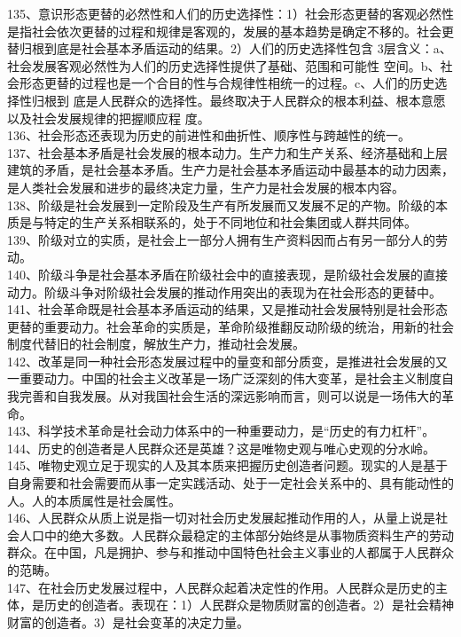 \documentclass[a4paper,fleqn]{article}
\begin{document}
135、意识形态更替的必然性和人们的历史选择性：1）社会形态更替的客观必然性是指社会依次更替的过程和规律是客观的，发展的基本趋势是确定不移的。社会更替归根到底是社会基本矛盾运动的结果。2）人们的历史选择性包含 3层含义：a、社会发展客观必然性为人们的历史选择性提供了基础、范围和可能性 空间。b、社会形态更替的过程也是一个合目的性与合规律性相统一的过程。c、人们的历史选择性归根到 底是人民群众的选择性。最终取决于人民群众的根本利益、根本意愿以及社会发展规律的把握顺应程 度。 \\
136、社会形态还表现为历史的前进性和曲折性、顺序性与跨越性的统一。 \\
137、社会基本矛盾是社会发展的根本动力。生产力和生产关系、经济基础和上层建筑的矛盾，是社会基本矛盾。生产力是社会基本矛盾运动中最基本的动力因素，是人类社会发展和进步的最终决定力量，生产力是社会发展的根本内容。 \\
138、阶级是社会发展到一定阶段及生产有所发展而又发展不足的产物。阶级的本质是与特定的生产关系相联系的，处于不同地位和社会集团或人群共同体。 \\
139、阶级对立的实质，是社会上一部分人拥有生产资料因而占有另一部分人的劳动。 \\
140、阶级斗争是社会基本矛盾在阶级社会中的直接表现，是阶级社会发展的直接动力。阶级斗争对阶级社会发展的推动作用突出的表现为在社会形态的更替中。 \\
141、社会革命既是社会基本矛盾运动的结果，又是推动社会发展特别是社会形态更替的重要动力。社会革命的实质是，革命阶级推翻反动阶级的统治，用新的社会制度代替旧的社会制度，解放生产力，推动社会发展。 \\
142、改革是同一种社会形态发展过程中的量变和部分质变，是推进社会发展的又一重要动力。中国的社会主义改革是一场广泛深刻的伟大变革，是社会主义制度自我完善和自我发展。从对我国社会生活的深远影响而言，则可以说是一场伟大的革命。 \\
143、科学技术革命是社会动力体系中的一种重要动力，是“历史的有力杠杆”。 \\
144、历史的创造者是人民群众还是英雄？这是唯物史观与唯心史观的分水岭。 \\
145、唯物史观立足于现实的人及其本质来把握历史创造者问题。现实的人是基于自身需要和社会需要而从事一定实践活动、处于一定社会关系中的、具有能动性的人。人的本质属性是社会属性。 \\
146、人民群众从质上说是指一切对社会历史发展起推动作用的人，从量上说是社会人口中的绝大多数。人民群众最稳定的主体部分始终是从事物质资料生产的劳动群众。在中国，凡是拥护、参与和推动中国特色社会主义事业的人都属于人民群众的范畴。 \\
147、在社会历史发展过程中，人民群众起着决定性的作用。人民群众是历史的主体，是历史的创造者。表现在：1）人民群众是物质财富的创造者。2）是社会精神财富的创造者。3）是社会变革的决定力量。 \\
\end{document}
